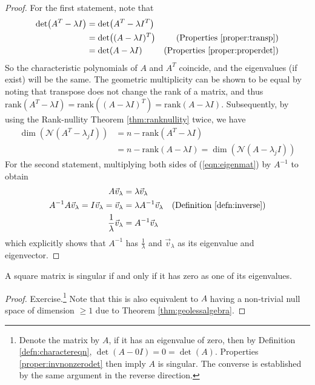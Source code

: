 \begin{proof}
For the first statement, note that
\begin{align*}
\det(A^T -\lambda I) &= \det(A^T - \lambda I^T) \\
&= \det((A - \lambda I)^T) & \text{(Properties \ref{proper:transp})} \\
&= \det(A - \lambda I) & \text{(Properties \ref{proper:properdet})}
\end{align*}
So the characteristic polynomials of $A$ and $A^T$ coincide, and the eigenvalues (if exist) will be the same. The geometric multiplicity can be shown to be equal by noting that transpose does not change the rank of a matrix, and thus $\text{rank}(A^T - \lambda I) = \text{rank}((A - \lambda I)^T) = \text{rank}(A - \lambda I)$. Subsequently, by using the Rank-nullity Theorem \ref{thm:ranknullity} twice, we have
\begin{align*}
\dim(\mathcal{N}(A^T-\lambda_j I)) &= n - \text{rank}(A^T - \lambda I) \\
&= n - \text{rank}(A - \lambda I) = \dim(\mathcal{N}(A-\lambda_j I))
\end{align*}
For the second statement, multiplying both sides of (\ref{eqn:eigenmat}) by $A^{-1}$ to obtain
\begin{align*}
A\vec{v}_\lambda &= \lambda\vec{v}_\lambda \\
A^{-1}A\vec{v}_\lambda = I\vec{v}_\lambda = \vec{v}_\lambda &= \lambda A^{-1}\vec{v}_\lambda & \text{(Definition \ref{defn:inverse})}\\
\frac{1}{\lambda}\vec{v}_\lambda &= A^{-1}\vec{v}_\lambda 
\end{align*}
which explicitly shows that $A^{-1}$ has $\frac{1}{\lambda}$ and $\vec{v}_\lambda$ as its eigenvalue and eigenvector.
\end{proof}
\begin{thm}
\label{thm:singularzeroeig}
A square matrix is singular if and only if it has zero as one of its eigenvalues.
\end{thm}
\begin{proof}
Exercise.\footnote{Denote the matrix by $A$, if it has an eigenvalue of zero, then by Definition \ref{defn:charactereqn}, $\det(A-0I) = 0 = \det(A)$. Properties \ref{proper:invnonzerodet} then imply $A$ is singular. The converse is established by the same argument in the reverse direction.} Note that this is also equivalent to $A$ having a non-trivial null space of dimension $\geq 1$ due to Theorem \ref{thm:geolessalgebra}.
\end{proof}

